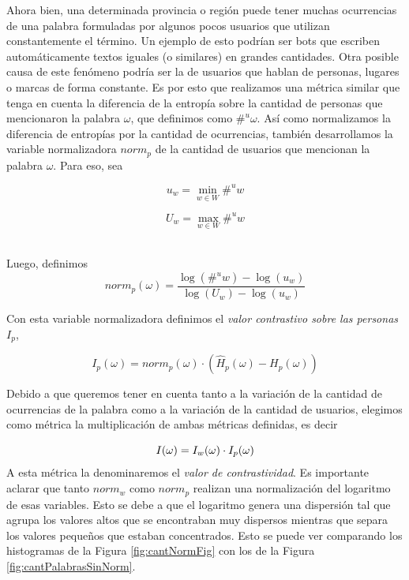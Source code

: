 Ahora bien, una determinada provincia o región puede tener muchas ocurrencias de una palabra formuladas por algunos pocos usuarios que utilizan constantemente el término. Un ejemplo de esto podrían ser bots que escriben automáticamente textos iguales (o similares) en grandes cantidades. Otra posible causa de este fenómeno podría ser la de usuarios que hablan de personas, lugares o marcas de forma constante.
Es por esto que realizamos una métrica similar que tenga en cuenta la diferencia de la entropía sobre la cantidad de personas que mencionaron la palabra $\omega$, que definimos como $\#^u \omega$. Así como normalizamos la diferencia de entropías por la cantidad de ocurrencias, también desarrollamos la variable normalizadora $norm_p$ de la cantidad de usuarios que mencionan la palabra $\omega$. 
Para eso, sea %

\noindent\begin{minipage}{.5\linewidth}
\begin{equation}
  u_w = \min \limits_{w \in W} \#^u w
\end{equation}
\end{minipage}%
\begin{minipage}{.5\linewidth}
\begin{equation}
  U_w = \max \limits_{w \in W} \#^u w
\end{equation}
\end{minipage}\\

Luego, definimos
\begin{equation}
norm_p(\omega) = \frac{\log\left(\#^u w\right) - \log \left(u_w\right)}{\log\left(U_w\right) - \log\left(u_w\right)}  
\label{eq:norm2}
\end{equation}

Con esta variable normalizadora definimos el \textit{valor contrastivo sobre las personas} $I_p$,

\begin{equation}
I_p(\omega) = norm_p(\omega) \cdot (\widehat{H}_p(\omega) - H_p(\omega))
\label{eq:iu}
\end{equation}

Debido a que queremos tener en cuenta tanto a la variación de la cantidad de ocurrencias de la palabra como a la variación de la cantidad de usuarios, elegimos como métrica la multiplicación de ambas métricas definidas, es decir  

\begin{equation}
I(\omega) =  I_w (\omega) \cdot I_p(\omega)\\
\label{eq:ivalor}
\end{equation}
A esta métrica la denominaremos el \textit{valor de contrastividad}.
Es importante aclarar que tanto $norm_{w}$ como $norm_p$ realizan una normalización del logaritmo de esas variables. Esto se debe a que el logaritmo genera una dispersión tal que agrupa los valores altos que se encontraban muy dispersos mientras que separa los valores pequeños que estaban concentrados. Esto se puede ver comparando los histogramas de la Figura \ref{fig:cantNormFig} con los de la Figura \ref{fig:cantPalabrasSinNorm}.

